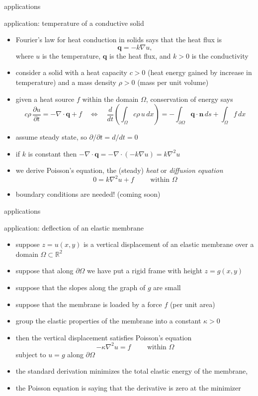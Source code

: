 \documentclass[10pt,
               svgnames,
               hyperref={colorlinks,
                         citecolor=DeepPink4,
                         linkcolor=FireBrick,
                         urlcolor=blue},
               usepdftitle=false]{beamer}
\newcommand{\bn}{\mathbf{n}}
\newcommand{\bq}{\mathbf{q}}
\newcommand{\RR}{\mathbb{R}}
\newcommand{\Div}{\nabla\cdot}
\newcommand{\grad}{\nabla}
\begin{document}
\begin{frame}{applications}

\begin{block}{application: temperature of a conductive solid}
\begin{itemize}
\small
\item Fourier's law for heat conduction in solids says that the heat flux is
    $$\bq = -k \grad u,$$
where $u$ is the temperature, $\bq$ is the heat flux, and $k>0$ is the conductivity
\item consider a solid with a heat capacity $c>0$ (heat energy gained by increase in temperature) and a mass density $\rho>0$ (mass per unit volume)
\item given a heat source $f$ within the domain $\Omega$, conservation of energy says
    $$c\rho\, \frac{\partial u}{\partial t} = - \Div\bq + f \quad \iff \quad \frac{d}{dt}\left(\int_\Omega c\rho\, u \,dx\right) = - \int_{\partial\Omega} \bq\cdot\bn\,ds + \int_\Omega f \,dx$$
\item assume steady state, so $\partial/\partial t=d/d t=0$
\item if $k$ is constant then $- \Div\bq = - \Div(-k \grad u) = k \grad^2 u$
\item we derive Poisson's equation, the (steady) \emph{heat} or \emph{diffusion equation}
    $$0 = k \grad^2 u + f \qquad \text{ within } \Omega$$
\item boundary conditions are needed!  (coming soon)
\end{itemize}
\end{block}
\end{frame}


\begin{frame}{applications}

\begin{block}{application: deflection of an elastic membrane}
\begin{itemize}
\small
\item suppose $z=u(x,y)$ is a vertical displacement of an elastic membrane over a domain $\Omega\subset \RR^2$
\item suppose that along $\partial \Omega$ we have put a rigid frame with height $z=g(x,y)$
\item suppose that the slopes along the graph of $g$ are small
\item suppose that the membrane is loaded by a force $f$ (per unit area)
\item group the elastic properties of the membrane into a constant $\kappa>0$
\item then the vertical displacement satisfies Poisson's equation
    $$- \kappa \grad^2 u = f \qquad \text{ within } \Omega$$
subject to $u=g$ along $\partial \Omega$
\item the standard derivation minimizes the total elastic energy of the membrane,
\item the Poisson equation is saying that the derivative is zero at the minimizer
\end{itemize}
\end{block}
\end{frame}
\end{document}
